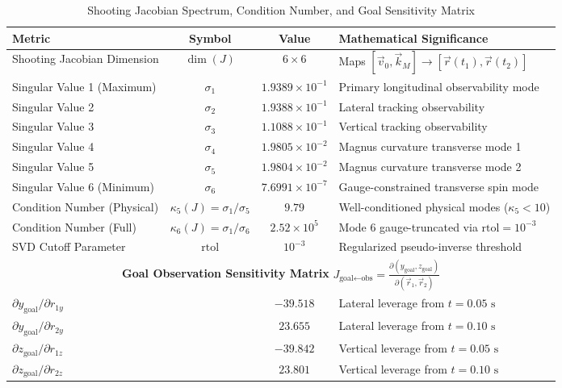 \begin{table}[htbp]
\centering
\caption{Shooting Jacobian Spectrum, Condition Number, and Goal Sensitivity Matrix}
\label{tab:jacobian_conditioning}
\begin{tabular}{lccl}
\toprule
\textbf{Metric} & \textbf{Symbol} & \textbf{Value} & \textbf{Mathematical Significance} \\
\midrule
Shooting Jacobian Dimension & $\dim(J)$ & $6 \times 6$ & Maps $[\vec{v}_0, \vec{k}_M] \to [\vec{r}(t_1), \vec{r}(t_2)]$ \\
Singular Value 1 (Maximum) & $\sigma_1$ & $1.9389\times 10^{-1}$ & Primary longitudinal observability mode \\
Singular Value 2 & $\sigma_2$ & $1.9388\times 10^{-1}$ & Lateral tracking observability \\
Singular Value 3 & $\sigma_3$ & $1.1088\times 10^{-1}$ & Vertical tracking observability \\
Singular Value 4 & $\sigma_4$ & $1.9805\times 10^{-2}$ & Magnus curvature transverse mode 1 \\
Singular Value 5 & $\sigma_5$ & $1.9804\times 10^{-2}$ & Magnus curvature transverse mode 2 \\
Singular Value 6 (Minimum) & $\sigma_6$ & $7.6991\times 10^{-7}$ & Gauge-constrained transverse spin mode \\
Condition Number (Physical) & $\kappa_5(J) = \sigma_1 / \sigma_5$ & $9.79$ & Well-conditioned physical modes ($\kappa_5 < 10$) \\
Condition Number (Full) & $\kappa_6(J) = \sigma_1 / \sigma_6$ & $2.52\times 10^{5}$ & Mode 6 gauge-truncated via $\text{rtol} = 10^{-3}$ \\
SVD Cutoff Parameter & $\text{rtol}$ & $10^{-3}$ & Regularized pseudo-inverse threshold \\
\midrule
\multicolumn{4}{c}{\textbf{Goal Observation Sensitivity Matrix} $J_{\text{goal} \leftarrow \text{obs}} = \frac{\partial (y_{\text{goal}}, z_{\text{goal}})}{\partial (\vec{r}_1, \vec{r}_2)}$} \\
$\partial y_{\text{goal}} / \partial r_{1y}$ & & $-39.518$ & Lateral leverage from $t = 0.05\text{ s}$ \\
$\partial y_{\text{goal}} / \partial r_{2y}$ & & $23.655$ & Lateral leverage from $t = 0.10\text{ s}$ \\
$\partial z_{\text{goal}} / \partial r_{1z}$ & & $-39.842$ & Vertical leverage from $t = 0.05\text{ s}$ \\
$\partial z_{\text{goal}} / \partial r_{2z}$ & & $23.801$ & Vertical leverage from $t = 0.10\text{ s}$ \\

\end{tabular}
\end{table}
